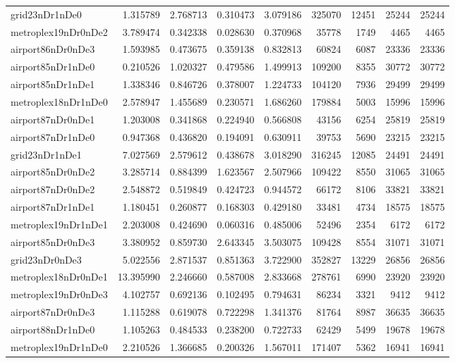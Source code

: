 \documentclass[../../../thesis.tex]{subfiles}
\begin{document}
\begin{longtable}{|l|r|r|r|r|r|r|r|r|}
grid23nDr1nDe0 & 1.315789 & 2.768713 & 0.310473 & 3.079186 & 325070 & 12451 & 25244 & 25244 \\
metroplex19nDr0nDe2 & 3.789474 & 0.342338 & 0.028630 & 0.370968 & 35778 & 1749 & 4465 & 4465 \\
airport86nDr0nDe3 & 1.593985 & 0.473675 & 0.359138 & 0.832813 & 60824 & 6087 & 23336 & 23336 \\
airport85nDr1nDe0 & 0.210526 & 1.020327 & 0.479586 & 1.499913 & 109200 & 8355 & 30772 & 30772 \\
airport85nDr1nDe1 & 1.338346 & 0.846726 & 0.378007 & 1.224733 & 104120 & 7936 & 29499 & 29499 \\
metroplex18nDr1nDe0 & 2.578947 & 1.455689 & 0.230571 & 1.686260 & 179884 & 5003 & 15996 & 15996 \\
airport87nDr0nDe1 & 1.203008 & 0.341868 & 0.224940 & 0.566808 & 43156 & 6254 & 25819 & 25819 \\
airport87nDr1nDe0 & 0.947368 & 0.436820 & 0.194091 & 0.630911 & 39753 & 5690 & 23215 & 23215 \\
grid23nDr1nDe1 & 7.027569 & 2.579612 & 0.438678 & 3.018290 & 316245 & 12085 & 24491 & 24491 \\
airport85nDr0nDe2 & 3.285714 & 0.884399 & 1.623567 & 2.507966 & 109422 & 8550 & 31065 & 31065 \\
airport87nDr0nDe2 & 2.548872 & 0.519849 & 0.424723 & 0.944572 & 66172 & 8106 & 33821 & 33821 \\
airport87nDr1nDe1 & 1.180451 & 0.260877 & 0.168303 & 0.429180 & 33481 & 4734 & 18575 & 18575 \\
metroplex19nDr1nDe1 & 2.203008 & 0.424690 & 0.060316 & 0.485006 & 52496 & 2354 & 6172 & 6172 \\
airport85nDr0nDe3 & 3.380952 & 0.859730 & 2.643345 & 3.503075 & 109428 & 8554 & 31071 & 31071 \\
grid23nDr0nDe3 & 5.022556 & 2.871537 & 0.851363 & 3.722900 & 352827 & 13229 & 26856 & 26856 \\
metroplex18nDr0nDe1 & 13.395990 & 2.246660 & 0.587008 & 2.833668 & 278761 & 6990 & 23920 & 23920 \\
metroplex19nDr0nDe3 & 4.102757 & 0.692136 & 0.102495 & 0.794631 & 86234 & 3321 & 9412 & 9412 \\
airport87nDr0nDe3 & 1.115288 & 0.619078 & 0.722298 & 1.341376 & 81764 & 8987 & 36635 & 36635 \\
airport88nDr1nDe0 & 1.105263 & 0.484533 & 0.238200 & 0.722733 & 62429 & 5499 & 19678 & 19678 \\
metroplex19nDr1nDe0 & 2.210526 & 1.366685 & 0.200326 & 1.567011 & 171407 & 5362 & 16941 & 16941 \\

\end{longtable}
\end{document}
